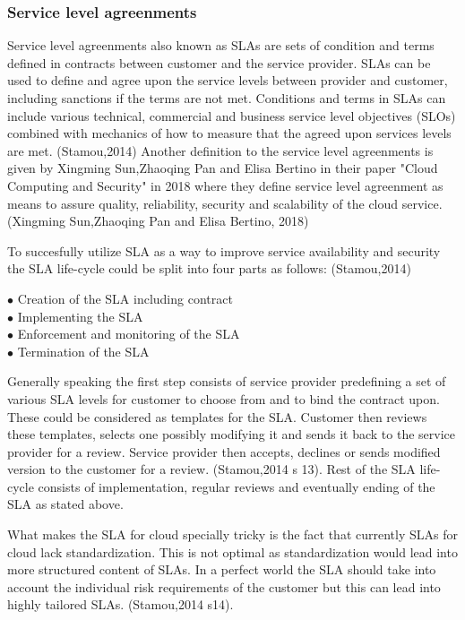 \documentclass{article}
\begin{document}
\subsubsection{Service level agreenments}
Service level agreenments also known as SLAs are sets of condition and terms defined in contracts between customer and the service provider. SLAs can be used to define and agree upon the service levels between provider and customer, including sanctions if the terms are not met. Conditions and terms in SLAs can include various technical, commercial and business service level objectives (SLOs) combined with mechanics of how to measure that the agreed upon services levels are met. (Stamou,2014) Another definition to the service level agreenments is given by Xingming Sun,Zhaoqing Pan and Elisa Bertino in their paper "Cloud Computing and Security" in 2018 where they define service level agreenment as means to assure quality, reliability, security and scalability of the cloud service. (Xingming Sun,Zhaoqing Pan and Elisa Bertino, 2018) 
\par
To succesfully utilize SLA as a way to improve service availability and security the SLA life-cycle could be split into four parts as follows: (Stamou,2014)
\begin{description}
        \item[$\bullet$ Creation of the SLA including contract]
        \item[$\bullet$ Implementing the SLA]
        \item[$\bullet$ Enforcement and monitoring of the SLA]
        \item[$\bullet$ Termination of the SLA]
\end{description}
Generally speaking the first step consists of service provider predefining a set of various SLA levels for customer to choose from and to bind the contract upon. These could be considered as templates for the SLA. Customer then reviews these templates, selects one possibly modifying it and sends it back to the service provider for a review. Service provider then accepts, declines or sends modified version to the customer for a review. (Stamou,2014 s 13). Rest of the SLA life-cycle consists of implementation, regular reviews and eventually ending of the SLA as stated above.
\par
What makes the SLA for cloud specially tricky is the fact that currently SLAs for cloud lack standardization. This is not optimal as standardization would lead into more structured content of SLAs. In a perfect world the SLA should take into account the individual risk requirements of the customer but this can lead into highly tailored SLAs. (Stamou,2014 s14).
\end{document}

